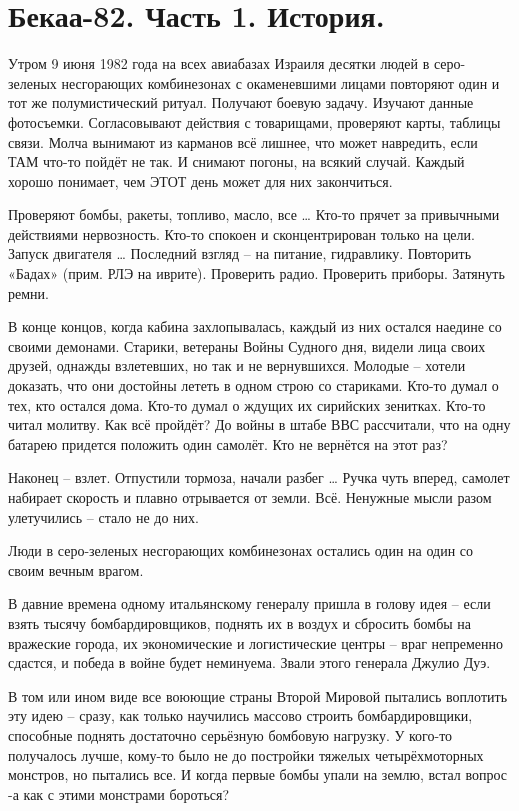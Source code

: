 \chapter{Бекаа-82. Часть 1. История.}

\begin{remark}
	 Утром 9 июня 1982 года на всех авиабазах Израиля десятки людей в серо-зеленых несгорающих комбинезонах с окаменевшими лицами повторяют один и тот же полумистический ритуал. Получают боевую задачу. Изучают данные фотосъемки. Согласовывают действия с товарищами, проверяют карты, таблицы связи. Молча вынимают из карманов всё лишнее, что может навредить, если ТАМ что-то пойдёт не так. И снимают погоны, на всякий случай. Каждый хорошо понимает, чем ЭТОТ день может для них закончиться.
	
	Проверяют бомбы, ракеты, топливо, масло, все … Кто-то прячет за привычными действиями нервозность. Кто-то спокоен и сконцентрирован только на цели.
	Запуск двигателя … Последний взгляд – на питание, гидравлику. Повторить «Бадах» (прим. РЛЭ на иврите). Проверить радио. Проверить приборы. Затянуть ремни.
	
	В конце концов, когда кабина захлопывалась, каждый из них остался наедине со своими демонами. Старики, ветераны Войны Судного дня, видели лица своих друзей, однажды взлетевших, но так и не вернувшихся. Молодые – хотели доказать, что они достойны лететь в одном строю со стариками. Кто-то думал о тех, кто остался дома. Кто-то думал о ждущих их сирийских зенитках. Кто-то читал молитву. Как всё пройдёт? До войны в штабе ВВС рассчитали, что на одну батарею придется положить один самолёт. Кто не вернётся на этот раз?
	
	Наконец – взлет. Отпустили тормоза, начали разбег … Ручка чуть вперед, самолет набирает скорость и плавно отрывается от земли. Всё. Ненужные мысли разом улетучились – стало не до них.
	
	Люди в серо-зеленых несгорающих комбинезонах остались один на один со своим вечным врагом.
\end{remark}

В давние времена одному итальянскому генералу пришла в голову идея – если взять тысячу бомбардировщиков, поднять их в воздух и сбросить бомбы на вражеские города, их экономические и логистические центры – враг непременно сдастся, и победа в войне будет неминуема. Звали этого генерала Джулио Дуэ.

В том или ином виде все воюющие страны Второй Мировой пытались воплотить эту идею – сразу, как только научились массово строить бомбардировщики, способные поднять достаточно серьёзную бомбовую нагрузку. У кого-то получалось лучше, кому-то было не до постройки тяжелых четырёхмоторных монстров, но пытались все. И когда первые бомбы упали на землю, встал вопрос -а как с этими монстрами бороться?

